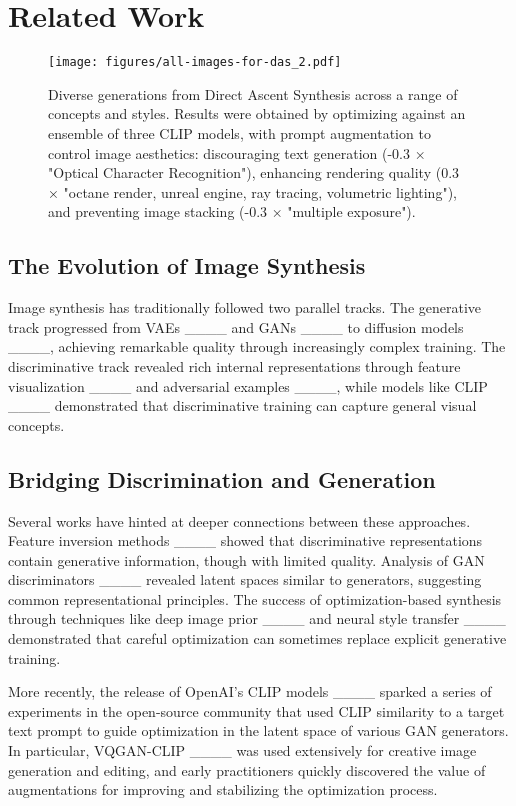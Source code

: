 \section{Related Work}
%
\begin{figure*}[t]
    \centering
    \texttt{[image: figures/all-images-for-das\_2.pdf]}
    \caption{Diverse generations from Direct Ascent Synthesis across a range of concepts and styles. Results were obtained by optimizing against an ensemble of three CLIP models, with prompt augmentation to control image aesthetics: discouraging text generation (-0.3 × "Optical Character Recognition"), enhancing rendering quality (0.3 × "octane render, unreal engine, ray tracing, volumetric lighting"), and preventing image stacking (-0.3 × "multiple exposure").}
    \label{fig:all-images}
\end{figure*}
%
\subsection{The Evolution of Image Synthesis}
Image synthesis has traditionally followed two parallel tracks. The generative track progressed from VAEs ____ and GANs ____ to diffusion models ____, achieving remarkable quality through increasingly complex training. The discriminative track revealed rich internal representations through feature visualization ____ and adversarial examples ____, while models like CLIP ____ demonstrated that discriminative training can capture general visual concepts.

\subsection{Bridging Discrimination and Generation}
Several works have hinted at deeper connections between these approaches. Feature inversion methods ____ showed that discriminative representations contain generative information, though with limited quality. Analysis of GAN discriminators ____ revealed latent spaces similar to generators, suggesting common representational principles. The success of optimization-based synthesis through techniques like deep image prior ____ and neural style transfer ____ demonstrated that careful optimization can sometimes replace explicit generative training.

More recently, the release of OpenAI's CLIP models ____ sparked a series of experiments in the open-source community that used CLIP similarity to a target text prompt to guide optimization in the latent space of various GAN generators. In particular, VQGAN-CLIP ____ was used extensively for creative image generation and editing, and early practitioners quickly discovered the value of augmentations for improving and stabilizing the optimization process.


